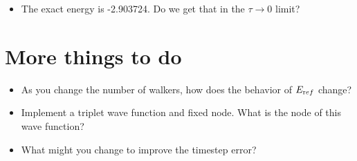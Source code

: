 \documentclass[12pt]{article}
\begin{document}
\begin{itemize}
\item The exact energy is -2.903724. Do we get that in the $\tau\rightarrow0$ limit?
\end{itemize}

\section{More things to do}
\begin{itemize}
\item As you change the number of walkers, how does the behavior of $E_{\text ref}$ change?
\item Implement a triplet wave function and fixed node. What is the node of this wave function?
\item What might you change to improve the timestep error? 
\end{itemize}
\end{document}
